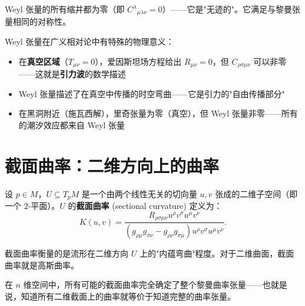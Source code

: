 Weyl 张量的所有缩并都为零（即 $C^\lambda{}_{\mu\lambda\nu} = 0$）——它是"无迹的"。它满足与黎曼张量相同的对称性。

\begin{note}[物理意义]
Weyl 张量在广义相对论中有特殊的物理意义：
\begin{itemize}
    \item 在\textbf{真空区域}（$T_{\mu\nu} = 0$），爱因斯坦场方程给出 $R_{\mu\nu} = 0$，但 $C_{\rho\sigma\mu\nu}$ 可以非零——这就是\textbf{引力波}的数学描述
    \item Weyl 张量描述了在真空中传播的时空弯曲——它是引力的"自由传播部分"
    \item 在黑洞附近（施瓦西解），里奇张量为零（真空），但 Weyl 张量非零——所有的潮汐效应都来自 Weyl 张量
\end{itemize}
\end{note}

\section{截面曲率：二维方向上的曲率}

\begin{definition}[截面曲率]
设 $p \in M$，$U \subseteq T_pM$ 是一个由两个线性无关的切向量 $u, v$ 张成的二维子空间（即一个 $2$-平面）。$U$ 的\textbf{截面曲率} (sectional curvature) 定义为：
\begin{equation}
    K(u, v) = \frac{R_{\rho\sigma\mu\nu} u^\rho v^\sigma u^\mu v^\nu}{(g_{\rho\mu}g_{\sigma\nu} - g_{\rho\nu}g_{\sigma\mu}) u^\rho v^\sigma u^\mu v^\nu}.
\end{equation}
\end{definition}

截面曲率衡量的是流形在二维方向 $U$ 上的"内蕴弯曲"程度。对于二维曲面，截面曲率就是高斯曲率。

\begin{property}
在 $n$ 维空间中，所有可能的截面曲率完全确定了整个黎曼曲率张量——也就是说，知道所有二维截面上的曲率就等价于知道完整的曲率张量。
\end{property}

